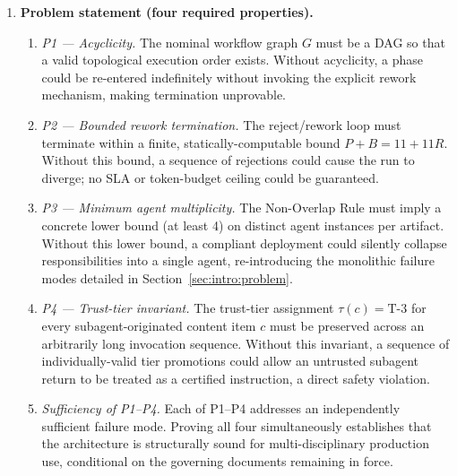\documentclass[12pt]{article}
\theoremstyle{definition}
\begin{document}
\begin{enumerate}
    \item \textbf{Problem statement (four required properties).}
    \begin{enumerate}
        \item[(2.1)] \emph{P1 --- Acyclicity.}
              The nominal workflow graph $G$ must be a DAG so that a
              valid topological execution order exists.
              Without acyclicity, a phase could be re-entered
              indefinitely without invoking the explicit rework
              mechanism, making termination unprovable.
        \item[(2.2)] \emph{P2 --- Bounded rework termination.}
              The reject/rework loop must terminate within a finite,
              statically-computable bound $P + B = 11 + 11R$.
              Without this bound, a sequence of rejections could cause
              the run to diverge; no SLA or token-budget ceiling could
              be guaranteed.
        \item[(2.3)] \emph{P3 --- Minimum agent multiplicity.}
              The Non-Overlap Rule must imply a concrete lower bound
              (at least 4) on distinct agent instances per artifact.
              Without this lower bound, a compliant deployment could
              silently collapse responsibilities into a single agent,
              re-introducing the monolithic failure modes detailed in
              Section~\ref{sec:intro:problem}.
        \item[(2.4)] \emph{P4 --- Trust-tier invariant.}
              The trust-tier assignment $\tau(c) = \mathrm{T\text{-}3}$
              for every subagent-originated content item $c$ must be
              preserved across an arbitrarily long invocation sequence.
              Without this invariant, a sequence of individually-valid
              tier promotions could allow an untrusted subagent return
              to be treated as a certified instruction, a direct safety
              violation.
        \item[(2.5)] \emph{Sufficiency of P1--P4.}
              Each of P1--P4 addresses an independently sufficient
              failure mode.
              Proving all four simultaneously establishes that the
              architecture is structurally sound for
              multi-disciplinary production use, conditional on the
              governing documents remaining in force.
    \end{enumerate}


\end{enumerate}
\end{document}
